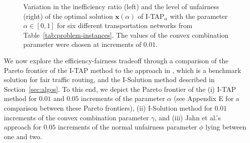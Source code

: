 \documentclass{article}
\newif\ifarxiv   %
\begin{document}
\begin{figure*}
    \centering
    \begin{subfigure}[t]{0.48\columnwidth}
        \centering
            
    \end{subfigure}
    \begin{subfigure}[t]{0.48\columnwidth}
        \centering
        \vspace{2.5pt}
        
    \end{subfigure}
    \vspace{-15pt}
    \caption{{\small \sf Variation in the inefficiency ratio (left) and the level of unfairness (right) of the optimal solution $\mathbf{x}(\alpha)$ of I-TAP$_{\alpha}$ with the parameter $\alpha \in [0, 1]$ for six different transportation networks from Table~\ref{tab:problem-instances}. The values of the convex combination parameter were chosen at increments of $0.01$.}%
    } %
    \label{fig:tt_v_alpha_and_beta_v_alpha_finer_discretization}
\end{figure*}






 We now explore the efficiency-fairness tradeoff through a comparison of the Pareto frontier of the I-TAP method to the approach in \cite{so-routing-seminal}, which is a benchmark solution for fair traffic routing, and the I-Solution method described in Section~\ref{sec:algos}. %
To this end, we depict the Pareto frontier of the (i) I-TAP method for $0.01$ and $0.05$
increments of the %
parameter \ifarxiv$\alpha$, \else $\alpha$ (see Appendix E for a comparison between these Pareto frontiers), \fi (ii) I-Solution method for $0.01$ increments of the convex combination parameter $\gamma$, and (iii) Jahn et al.'s approach \cite{so-routing-seminal} for $0.05$ increments of the normal unfairness parameter $\phi$ lying between one and two. %
\end{document}
